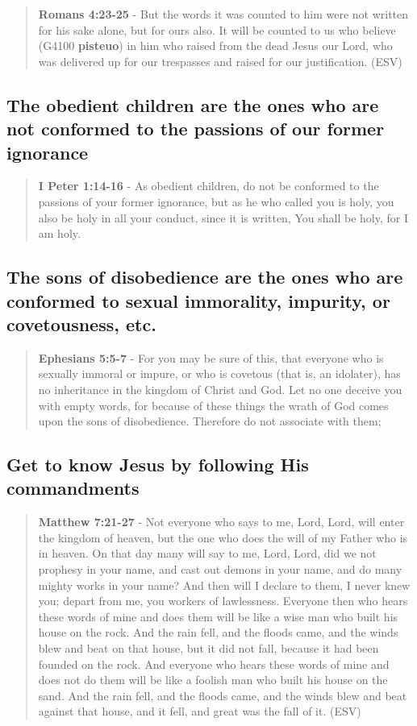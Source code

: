 \documentclass[11pt]{article}
\begin{document}
\begin{quote}
\textbf{Romans 4:23-25} - But the words it was counted to him were not written for his sake alone, but for ours also. It will be counted to us who believe (G4100 \textbf{pisteuo}) in him who raised from the dead Jesus our Lord, who was delivered up for our trespasses and raised for our justification. (ESV)
\end{quote}

\subsection{The obedient children are the ones who are not conformed to the passions of our former ignorance}
\label{sec:org459cef8}
\begin{quote}
\textbf{I Peter 1:14-16} - As obedient children, do not be conformed to the passions of your former ignorance, but as he who called you is holy, you also be holy in all your conduct, since it is written, You shall be holy, for I am holy.
\end{quote}

\subsection{The sons of disobedience are the ones who are conformed to sexual immorality, impurity, or covetousness, etc.}
\label{sec:orgdc9f6b4}
\begin{quote}
\textbf{Ephesians 5:5-7} - For you may be sure of this, that everyone who is sexually immoral or impure, or who is covetous (that is, an idolater), has no inheritance in the kingdom of Christ and God. Let no one deceive you with empty words, for because of these things the wrath of God comes upon the sons of disobedience. Therefore do not associate with them;
\end{quote}

\subsection{Get to know Jesus by following His commandments}
\label{sec:org57e04f1}
\begin{quote}
\textbf{Matthew 7:21-27} - Not everyone who says to me, Lord, Lord, will enter the kingdom of heaven, but the one who does the will of my Father who is in heaven.  On that day many will say to me, Lord, Lord, did we not prophesy in your name, and cast out demons in your name, and do many mighty works in your name?  And then will I declare to them, I never knew you; depart from me, you workers of lawlessness.  Everyone then who hears these words of mine and does them will be like a wise man who built his house on the rock.  And the rain fell, and the floods came, and the winds blew and beat on that house, but it did not fall, because it had been founded on the rock.  And everyone who hears these words of mine and does not do them will be like a foolish man who built his house on the sand.  And the rain fell, and the floods came, and the winds blew and beat against that house, and it fell, and great was the fall of it. (ESV)
\end{quote}
\end{document}

